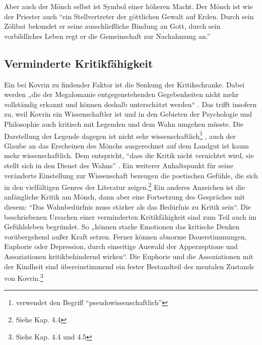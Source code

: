 \documentclass[12pt,headsepline,a4paper]{scrartcl}
\begin{document}
Aber auch der Mönch selbst ist Symbol einer höheren Macht. Der Mönch ist wie der Priester auch
``ein Stellvertreter der göttlichen Gewalt auf Erden. Durch sein Zölibat bekundet er seine
ausschließliche Bindung an Gott, durch sein vorbildliches Leben regt er die Gemeinschaft zur
Nachahmung an.''\autocite[248]{brittnacher}
\subsection{Verminderte Kritikfähigkeit}
Ein bei Kovrin zu findender Faktor ist die Senkung der Kritikschranke. Dabei werden „die der
Megalomanie entgegenstehenden Gegebenheiten nicht mehr vollständig erkannt und können
deshalb unterschätzt werden“\autocite[85]{avenarius} . Das trifft insofern zu, weil Kovrin ein Wissenschaftler ist und in
den Gebieten der Psychologie und Philosophie auch kritisch mit Legenden und dem Wahn umgehen
müsste. Die Darstellung der Legende dagegen ist nicht sehr wissenschaftlich\footnote{\autocite{kluge}
verwendet den Begriff ``pseudowissenschaftlich''
} , auch der Glaube an
das Erscheinen des Mönchs ausgerechnet auf dem Landgut ist kaum mehr wissenschaftlich. Dem
entspricht, ``dass die Kritik nicht vernichtet wird, sie stellt 
sich in den Dienst des Wahns''\autocite{avenarius}
. Ein
weiterer Anhaltspunkt für seine veränderte Einstellung zur Wissenschaft bezeugen die poetischen
Gefühle, die sich in den vielfältigen Genres der Literatur zeigen.\footnote{Siehe Kap. 4.4} Ein anderes Anzeichen ist die
anfängliche Kritik am Mönch, dann aber eine Fortsetzung des Gespräches mit diesem: “Das
Wahnbedürfnis muss stärker als das Bedürfnis zu Kritik sein“\autocite[59]{avenarius}. Die beschriebenen Ursachen einer
verminderten Kritikfähigkeit sind zum Teil auch im Gefühlsleben begründet. So „können starke
Emotionen das kritische Denken vorübergehend außer Kraft setzen. Ferner können abnorme
Dauerstimmungen, Euphorie oder Depression, durch einseitige Auswahl der Apperzeptione und
Assoziationen kritikbehindernd wirken“\autocite[63]{avenarius}. Die Euphorie und die Assoziationen mit der Kindheit
sind übereinstimmend ein fester Bestandteil des mentalen Zustands von Kovrin.\footnote{Siehe Kap. 4.4 und 4.5}
\end{document}
